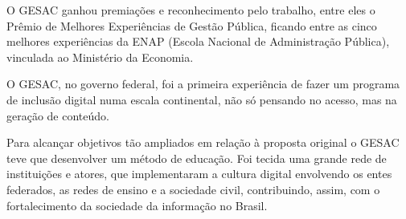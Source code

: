 \documentclass[
12pt,		%
openright,	%
twoside,  %
a4paper,			%
chapter=TITLE,		%
english,			%
french,				%
spanish,			%
brazil				%
]{USPSC-classe/USPSC}
\begin{document}
O GESAC ganhou premia\c{c}\~oes e reconhecimento pelo trabalho, entre eles o Pr\^emio de Melhores Experi\^encias de Gest\~ao P\'ublica, ficando entre as cinco melhores experi\^encias da ENAP (Escola Nacional de Administra\c{c}\~ao P\'ublica), vinculada ao Minist\'erio da Economia.









\noindent\begin{center}\mbox{\centering{}}\end{center}


O GESAC, no governo federal, foi a primeira experi\^encia de fazer um programa de inclus\~ao digital numa escala continental, n\~ao s\'o pensando no acesso, mas na gera\c{c}\~ao de conte\'udo.









\noindent\begin{center}\mbox{\centering{}}\end{center}


Para alcan\c{c}ar objetivos t\~ao ampliados em rela\c{c}\~ao \`a proposta original o GESAC teve que desenvolver um m\'etodo de educa\c{c}\~ao. Foi tecida uma grande rede de institui\c{c}\~oes e atores, que  implementaram  a cultura digital envolvendo os entes federados, as redes de ensino  e a sociedade civil,  contribuindo, assim, com o fortalecimento da sociedade da informa\c{c}\~ao no Brasil.
\end{document}
